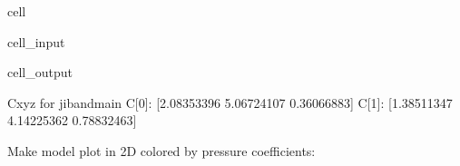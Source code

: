 \documentclass[letterpaper,10pt,english]{jupyterBook}
\begin{document}
\begin{sphinxuseclass}{cell}\begin{sphinxVerbatimInput}

\begin{sphinxuseclass}{cell_input}
\begin{sphinxVerbatim}[commandchars=\\\{\}]
   
    
    \PYG{l+s+s2}{C[}\PYG{l+s+s2}{]: }
\end{sphinxVerbatim}

\end{sphinxuseclass}\end{sphinxVerbatimInput}
\begin{sphinxVerbatimOutput}

\begin{sphinxuseclass}{cell_output}
\begin{sphinxVerbatim}[commandchars=\\\{\}]
Cxyz for jib\PYGZus{}and\PYGZus{}main
C[0]: [\PYGZhy{}2.08353396  5.06724107 \PYGZhy{}0.36066883]
C[1]: [\PYGZhy{}1.38511347  4.14225362 \PYGZhy{}0.78832463]
\end{sphinxVerbatim}

\end{sphinxuseclass}\end{sphinxVerbatimOutput}

\end{sphinxuseclass}
\sphinxAtStartPar
Make model plot in 2D colored by pressure coefficients:
\end{document}
